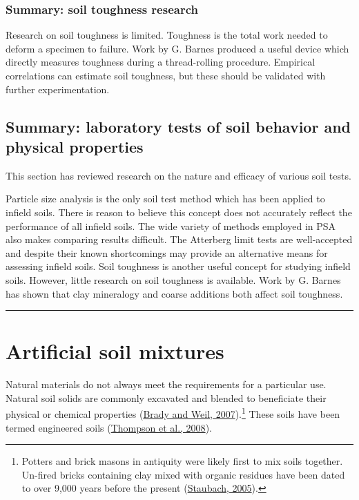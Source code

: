 \documentclass[
  letterpaper,
  openany]{book}
\begin{document}
\hypertarget{summary-soil-toughness-research}{%
\subsubsection{Summary: soil toughness research}\label{summary-soil-toughness-research}}

Research on soil toughness is limited.
Toughness is the total work needed to deform a specimen to failure.
Work by G. Barnes produced a useful device which directly measures toughness during a thread-rolling procedure.
Empirical correlations can estimate soil toughness, but these should be validated with further experimentation.

\newpage

\hypertarget{summary-laboratory-tests-of-soil-behavior-and-physical-properties}{%
\subsection{Summary: laboratory tests of soil behavior and physical properties}\label{summary-laboratory-tests-of-soil-behavior-and-physical-properties}}

This section has reviewed research on the nature and efficacy of various soil tests.

Particle size analysis is the only soil test method which has been applied to infield soils.
There is reason to believe this concept does not accurately reflect the performance of all infield soils.
The wide variety of methods employed in PSA also makes comparing results difficult.
The Atterberg limit tests are well-accepted and despite their known shortcomings may provide an alternative means for assessing infield soils.
Soil toughness is another useful concept for studying infield soils.
However, little research on soil toughness is available.
Work by G. Barnes has shown that clay mineralogy and coarse additions both affect soil toughness.

\begin{center}\rule{0.5\linewidth}{0.5pt}\end{center}

\newpage

\hypertarget{artificial-soil-mixtures}{%
\section{Artificial soil mixtures}\label{artificial-soil-mixtures}}

Natural materials do not always meet the requirements for a particular use.
Natural soil solids are commonly excavated and blended to beneficiate their physical or chemical properties (\protect\hyperlink{ref-Brady2007}{Brady and Weil, 2007}).\footnote{Potters and brick masons in antiquity were likely first to mix soils together.
  Un-fired bricks containing clay mixed with organic residues have been dated to over 9,000 years before the present (\protect\hyperlink{ref-Staubach2005}{Staubach, 2005}).}
These soils have been termed engineered soils (\protect\hyperlink{ref-Thompson2008a}{Thompson et al., 2008}).
\end{document}
